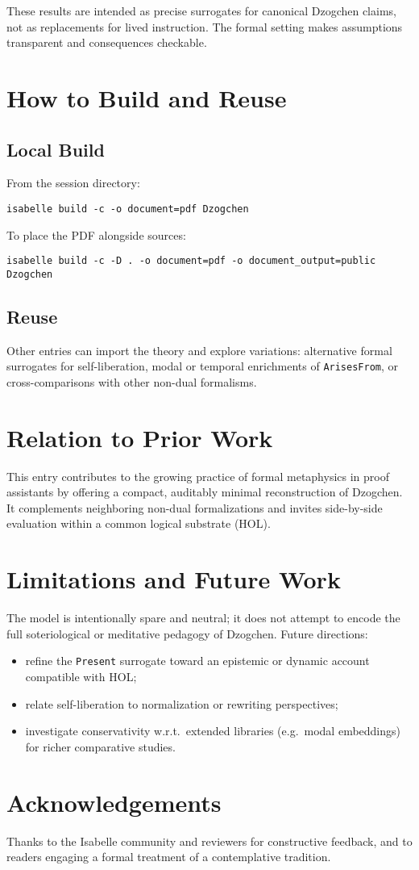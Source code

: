 \documentclass[11pt,a4paper]{article}
\begin{document}
These results are intended as precise surrogates for canonical Dzogchen claims,
not as replacements for lived instruction. The formal setting makes assumptions
transparent and consequences checkable.

\section{How to Build and Reuse}

\subsection{Local Build}
From the session directory:
\begin{lstlisting}
isabelle build -c -o document=pdf Dzogchen
\end{lstlisting}
To place the PDF alongside sources:
\begin{lstlisting}
isabelle build -c -D . -o document=pdf -o document_output=public Dzogchen
\end{lstlisting}

\subsection{Reuse}
Other entries can import the theory and explore variations:
alternative formal surrogates for self-liberation, modal or temporal enrichments
of \texttt{ArisesFrom}, or cross-comparisons with other non-dual formalisms.

\section{Relation to Prior Work}

This entry contributes to the growing practice of formal metaphysics in proof
assistants by offering a compact, auditably minimal reconstruction of Dzogchen.
It complements neighboring non-dual formalizations and invites side-by-side
evaluation within a common logical substrate (HOL).

\section{Limitations and Future Work}

The model is intentionally spare and neutral; it does not attempt to encode the
full soteriological or meditative pedagogy of Dzogchen. Future directions:
\begin{itemize}
  \item refine the \texttt{Present} surrogate toward an epistemic or dynamic
        account compatible with HOL;
  \item relate self-liberation to normalization or rewriting perspectives;
  \item investigate conservativity w.r.t.\ extended libraries (e.g.\ modal
        embeddings) for richer comparative studies.
\end{itemize}

\section{Acknowledgements}

Thanks to the Isabelle community and reviewers for constructive feedback, and
to readers engaging a formal treatment of a contemplative tradition.

\bigskip



\end{document}
